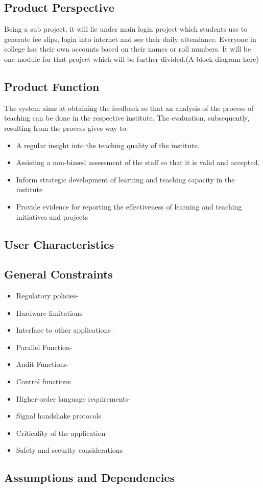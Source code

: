 \subsection{Product Perspective}
Being a sub project, it will lie under main login project which
students use to generate fee slips, login into internet and see
their daily attendance. Everyone in college has their own accounts
based on their names or roll numbers. It will be one module for 
that project which will be further divided.(A block diagram here)

\subsection{Product Function}
The system aims at obtaining the feedback so that an analysis of 
the process of teaching can be done in the respective institute. 
The evaluation, subsequently, resulting from the process gives way to:
\begin{itemize}
\item A regular insight into the teaching quality of the institute.
\item Assisting a non-biased assessment of the staff so that it is valid
and accepted. 
\item Inform strategic development of learning and teaching capacity 
in the institute
\item Provide evidence for reporting the effectiveness of learning 
and teaching initiatives and  projects
\end{itemize}

\subsection{User Characteristics}

\subsection{General Constraints}
\begin{itemize}
\item Regulatory policies-
\item Hardware limitations-
\item Interface to other applications-
\item Parallel Function-
\item Audit Functions-
\item Control functions
\item Higher-order language requirements-
\item Signal handshake protocols
\item  Criticality of the application
\item Safety and security considerations
\end{itemize}

\subsection{Assumptions and Dependencies}
